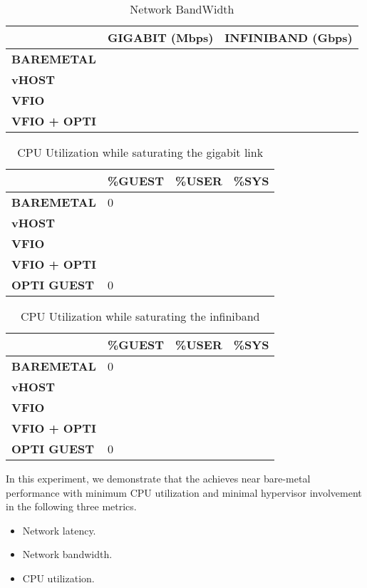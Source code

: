 \begin{table}
\begin{tabular}{|l|p{2cm}|p{2cm}|}
\hline
\textbf{} & \textbf{GIGABIT (Mbps)} & \textbf{INFINIBAND (Gbps)} \\ \hline
\textbf{BAREMETAL} & & \\ \hline
\textbf{vHOST} & & \\ \hline
\textbf{VFIO} & & \\ \hline
\textbf{VFIO + OPTI} & & \\
\hline
\end{tabular}
\caption{Network BandWidth}
\label{tab:network_bandwidth}
\end{table}

\begin{table}
\begin{tabular}{|l|l|l|l|}
\hline
\textbf{} & \textbf{\%GUEST} & \textbf{\%USER} & \textbf{\%SYS} \\ \hline
\textbf{BAREMETAL} & 0 & & \\ \hline
\textbf{vHOST} & & & \\ \hline
\textbf{VFIO} & & & \\ \hline
\textbf{VFIO + OPTI} & & & \\ \hline
\textbf{OPTI GUEST} & 0 & & \\
\hline
\end{tabular}
\caption{CPU Utilization while saturating the gigabit link}
\label{tab:cpu_utilization_1gbps}
\end{table}

\begin{table}
\begin{tabular}{|l|l|l|l|}
\hline
\textbf{} & \textbf{\%GUEST} & \textbf{\%USER} & \textbf{\%SYS} \\ \hline
\textbf{BAREMETAL} & 0 & & \\ \hline
\textbf{vHOST} & & & \\ \hline
\textbf{VFIO} & & & \\ \hline
\textbf{VFIO + OPTI} & & & \\ \hline
\textbf{OPTI GUEST} & 0 & & \\
\hline
\end{tabular}
\caption{CPU Utilization while saturating the infiniband}
\label{tab:cpu_utilization_40gbps}
\end{table}

In this experiment, we demonstrate that the \na achieves near
bare-metal performance with minimum CPU utilization and
minimal hypervisor involvement in the following three metrics.
\begin{itemize}
  \item Network latency.
  \item Network bandwidth.
  \item CPU utilization.
\end{itemize}

